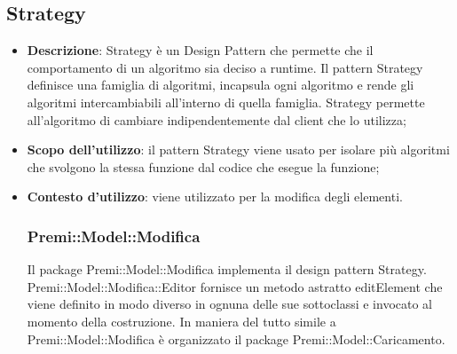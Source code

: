 {	\subsection{Strategy}{
		\begin{itemize}
			\item \textbf{Descrizione}: Strategy è un Design Pattern che permette che il comportamento di un algoritmo sia deciso a runtime.
			Il pattern Strategy definisce una famiglia di algoritmi, incapsula ogni algoritmo e rende gli algoritmi intercambiabili all'interno di quella famiglia.
			Strategy permette all'algoritmo di cambiare indipendentemente dal client che lo utilizza;\\
			\item \textbf{Scopo dell’utilizzo}: il pattern Strategy viene usato per isolare più algoritmi che svolgono la stessa funzione dal codice che esegue la funzione;
			\item \textbf{Contesto d’utilizzo}: viene utilizzato per la modifica degli elementi.
			\subsubsection{Premi::Model::Modifica}{
			Il package Premi::Model::Modifica implementa il design pattern Strategy.
			Premi::Model::Modifica::Editor fornisce un metodo astratto editElement che viene definito in modo diverso in ognuna delle sue sottoclassi e invocato al momento della costruzione.
			}
			In maniera del tutto simile a Premi::Model::Modifica è organizzato il package Premi::Model::Caricamento.
		\end{itemize}
	}
}